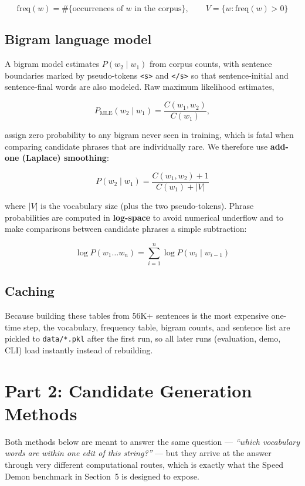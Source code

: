 \documentclass[11pt]{article}
\begin{document}
\[
\mathrm{freq}(w) = \#\{\text{occurrences of } w \text{ in the corpus}\}, \qquad V = \{w : \mathrm{freq}(w) > 0\}
\]

\subsection{Bigram language model}

A bigram model estimates $P(w_2 \mid w_1)$ from corpus counts, with sentence boundaries marked by pseudo-tokens \texttt{<s>} and \texttt{</s>} so that sentence-initial and sentence-final words are also modeled. Raw maximum likelihood estimates,

\[
P_{\mathrm{MLE}}(w_2 \mid w_1) = \frac{C(w_1, w_2)}{C(w_1)},
\]

assign zero probability to any bigram never seen in training, which is fatal when comparing candidate phrases that are individually rare. We therefore use \textbf{add-one (Laplace) smoothing}:

\[
P(w_2 \mid w_1) = \frac{C(w_1, w_2) + 1}{C(w_1) + |V|}
\]

where $|V|$ is the vocabulary size (plus the two pseudo-tokens). Phrase probabilities are computed in \textbf{log-space} to avoid numerical underflow and to make comparisons between candidate phrases a simple subtraction:

\[
\log P(w_1 \ldots w_n) = \sum_{i=1}^{n} \log P(w_i \mid w_{i-1})
\]

\subsection{Caching}

Because building these tables from 56K+ sentences is the most expensive one-time step, the vocabulary, frequency table, bigram counts, and sentence list are pickled to \texttt{data/*.pkl} after the first run, so all later runs (evaluation, demo, CLI) load instantly instead of rebuilding.

\section{Part 2: Candidate Generation Methods}

Both methods below are meant to answer the same question --- \textit{``which vocabulary words are within one edit of this string?''} --- but they arrive at the answer through very different computational routes, which is exactly what the Speed Demon benchmark in Section~5 is designed to expose.
\end{document}
